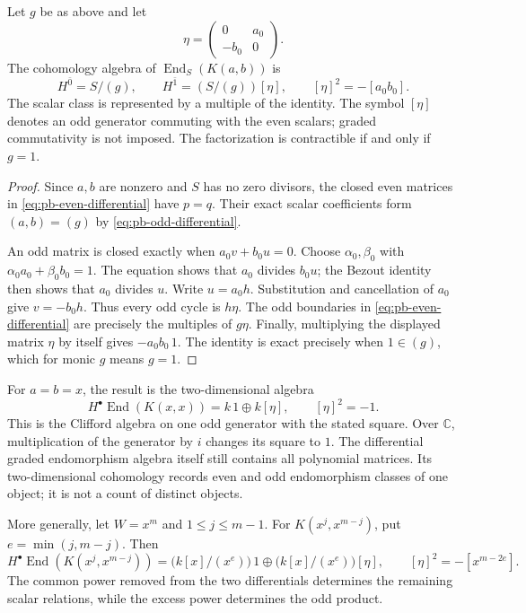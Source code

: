 \begin{theorem}
\label{thm:pb-rank-one}
Let \(g\) be as above and let
\[
 \eta=\begin{pmatrix}0&a_0\\-b_0&0\end{pmatrix}.
\]
The cohomology algebra of \(\operatorname{End}_S(K(a,b))\) is
\begin{equation}
 H^{\bar0}=S/(g),\qquad H^{\bar1}=(S/(g))[\eta],
 \qquad [\eta]^2=-[a_0b_0].
 \label{eq:pb-rank-one-cohomology}
\end{equation}
The scalar class is represented by a multiple of the identity.
The symbol \([\eta]\) denotes an odd generator commuting with the
even scalars; graded commutativity is not imposed.
The factorization is contractible if and only if \(g=1\).
\end{theorem}
\begin{proof}
Since \(a,b\) are nonzero and \(S\) has no zero divisors, the closed
even matrices in \eqref{eq:pb-even-differential} have \(p=q\).
Their exact scalar coefficients form \((a,b)=(g)\) by
\eqref{eq:pb-odd-differential}.

An odd matrix is closed exactly when \(a_0v+b_0u=0\).
Choose \(\alpha_0,\beta_0\) with
\(\alpha_0a_0+\beta_0b_0=1\). The equation shows that \(a_0\)
divides \(b_0u\); the Bezout identity then shows that \(a_0\)
divides \(u\). Write \(u=a_0h\). Substitution and cancellation of
\(a_0\) give \(v=-b_0h\). Thus every odd cycle is \(h\eta\).
The odd boundaries in \eqref{eq:pb-even-differential} are precisely
the multiples of \(g\eta\). Finally, multiplying the displayed
matrix \(\eta\) by itself gives \(-a_0b_0\,1\).
The identity is exact precisely when \(1\in(g)\), which for monic
\(g\) means \(g=1\).
\end{proof}

For \(a=b=x\), the result is the two-dimensional algebra
\[
 H^\bullet\operatorname{End}(K(x,x))
   =k\,1\oplus k[\eta],\qquad [\eta]^2=-1.
\]
This is the Clifford algebra on one odd generator with the stated
square. Over \(\mathbb C\), multiplication of the generator by \(i\)
changes its square to \(1\). The differential graded endomorphism
algebra itself still contains all polynomial matrices. Its
two-dimensional cohomology records even and odd endomorphism
classes of one object; it is not a count of distinct objects.

More generally, let \(W=x^m\) and \(1\leq j\leq m-1\).
For \(K(x^j,x^{m-j})\), put
\(e=\min(j,m-j)\). Then
\[
 H^\bullet\operatorname{End}(K(x^j,x^{m-j}))
   =\bigl(k[x]/(x^e)\bigr)\,1
    \oplus\bigl(k[x]/(x^e)\bigr)[\eta],
 \qquad [\eta]^2=-[x^{m-2e}].
\]
The common power removed from the two differentials determines the
remaining scalar relations, while the excess power determines the
odd product.

